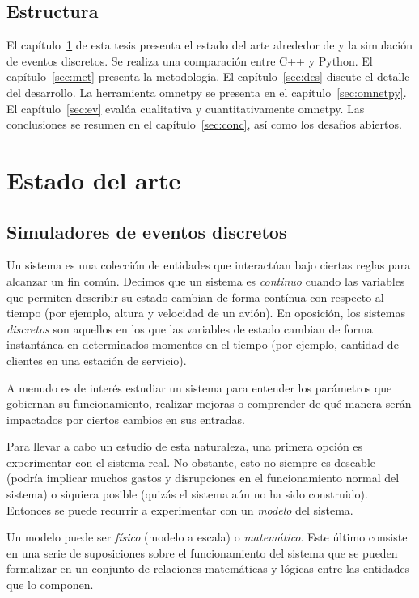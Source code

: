 \documentclass[]{article}
\begin{document}
\subsection{Estructura}

El capítulo~\ref{sec:eda} de esta tesis presenta el estado del arte alrededor
de \omnetpp{} y la simulación de eventos discretos. Se realiza una comparación
entre C++ y Python. El capítulo~\ref{sec:met} presenta la metodología. El
capítulo~\ref{sec:des} discute el detalle del desarrollo. La herramienta
omnetpy se presenta en el capítulo~\ref{sec:omnetpy}. El capítulo~\ref{sec:ev}
evalúa cualitativa y cuantitativamente omnetpy. Las conclusiones se resumen en
el capítulo~\ref{sec:conc}, así como los desafíos abiertos.

\section{Estado del arte}\label{sec:eda}

\subsection{Simuladores de eventos discretos}

Un sistema es una colección de entidades que interactúan bajo ciertas reglas
para alcanzar un fin común. Decimos que un sistema es \textit{continuo} cuando
las variables que permiten describir su estado cambian de forma contínua con
respecto al tiempo (por ejemplo, altura y velocidad de un avión). En oposición,
los sistemas \textit{discretos} son aquellos en los que las variables de estado
cambian de forma instantánea en determinados momentos en el tiempo (por
ejemplo, cantidad de clientes en una estación de servicio).

A menudo es de interés estudiar un sistema para entender los parámetros que
gobiernan su funcionamiento, realizar mejoras o comprender de qué manera serán
impactados por ciertos cambios en sus entradas.

Para llevar a cabo un estudio de esta naturaleza, una primera opción es
experimentar con el sistema real. No obstante, esto no siempre es deseable
(podría implicar muchos gastos y disrupciones en el funcionamiento normal del
sistema) o siquiera posible (quizás el sistema aún no ha sido construido).
Entonces se puede recurrir a experimentar con un \textit{modelo} del sistema.

Un modelo puede ser \textit{físico} (modelo a escala) o \textit{matemático}.
Este último consiste en una serie de suposiciones sobre el funcionamiento del
sistema que se pueden formalizar en un conjunto de relaciones matemáticas y
lógicas entre las entidades que lo componen.
\end{document}
